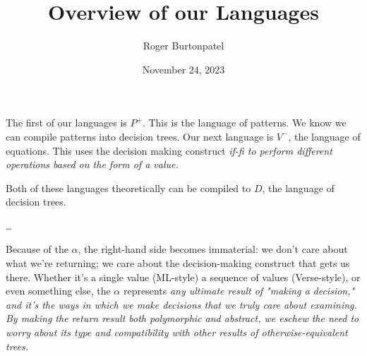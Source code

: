 \documentclass{article}
\title{Overview of our Languages}
\author{Roger Burtonpatel}
\date{November 24, 2023}
\begin{document}
\maketitle

The first of our languages is $P^{+}$. This is the language of patterns. We know
we can compile patterns into decision trees. Our next language is $V^{-}$, the
language of equations. This uses the decision making construct \it{if-fi} to
perform different operations based on the form of a value. 

Both of these languages theoretically can be compiled to $D$, the language
of decision trees. 


\dots

Because of the $\alpha$, the right-hand side becomes immaterial: we don't care
about what we're returning; we care about the decision-making construct that
gets us there. Whether it's a single value (ML-style) a sequence of values
(Verse-style), or even something else, the $\alpha$ represents \it{any} ultimate
result of "making a decision," and it's the ways in which we make decisions that
we truly care about examining. By making the return result both polymorphic and
abstract, we eschew the need to worry about its type and compatibility with
other results of otherwise-equivalent trees. 
\end{document}
